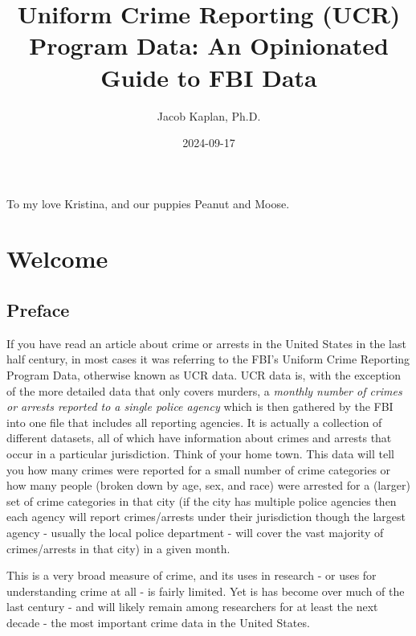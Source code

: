 \documentclass[
]{krantz}
\title{Uniform Crime Reporting (UCR) Program Data: An
Opinionated Guide to FBI Data}
\author{Jacob Kaplan, Ph.D.}
\date{2024-09-17}
\begin{document}
\maketitle

\thispagestyle{empty}
\begin{center}
To my love Kristina, and our puppies Peanut and Moose.
\end{center}

\setlength{\abovedisplayskip}{-5pt}
\setlength{\abovedisplayshortskip}{-5pt}

{
\hypersetup{linkcolor=}
\setcounter{tocdepth}{2}
\tableofcontents
}
\mainmatter

\part{Welcome}\label{part-welcome}

\chapter{Preface}\label{preface}

If you have read an article about crime or arrests in the
United States in the last half century, in most cases it was
referring to the FBI's Uniform Crime Reporting Program Data,
otherwise known as UCR data. UCR data is, with the exception
of the more detailed data that only covers murders, a
\emph{monthly number of crimes or arrests reported to a
single police agency} which is then gathered by the FBI into
one file that includes all reporting agencies. It is
actually a collection of different datasets, all of which
have information about crimes and arrests that occur in a
particular jurisdiction. Think of your home town. This data
will tell you how many crimes were reported for a small
number of crime categories or how many people (broken down
by age, sex, and race) were arrested for a (larger) set of
crime categories in that city (if the city has multiple
police agencies then each agency will report crimes/arrests
under their jurisdiction though the largest agency - usually
the local police department - will cover the vast majority
of crimes/arrests in that city) in a given month.

This is a very broad measure of crime, and its uses in
research - or uses for understanding crime at all - is
fairly limited. Yet is has become over much of the last
century - and will likely remain among researchers for at
least the next decade - the most important crime data in the
United States.
\end{document}
